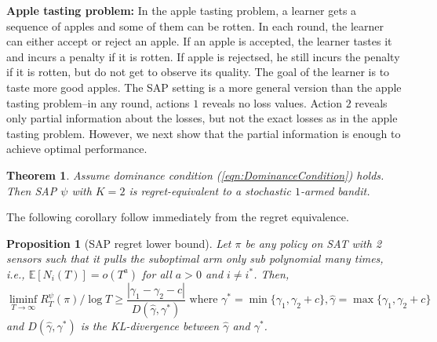 \documentclass{article}
\newtheorem{thm}{Theorem}
\newtheorem{proposition}{Proposition}
\begin{document}
\noindent
{\bf Apple tasting problem:} In the apple tasting problem, a learner gets a sequence of apples and some of them can be rotten. In each round, the learner can either accept or reject an apple. If an apple is accepted, the learner tastes it and incurs a penalty if it is rotten. If apple is rejectsed, he still incurs the penalty if it is rotten, but do not get to observe its quality. %
The goal of the learner is to taste more good apples. 
The SAP setting is a more general version than the apple tasting problem--in any round, actions $1$ reveals no loss values. Action $2$  reveals only partial information about the losses, but not the exact losses as in the apple tasting problem. However, we next show that the partial information is enough to achieve optimal performance.  

\begin{thm}
	\label{thm:2SAPRegret}
Assume dominance condition (\ref{eqn:DominanceCondition}) holds. Then SAP $\psi$ with $K=2$ is regret-equivalent to a stochastic $1$-armed bandit.
\end{thm}
The following corollary follow immediately from the regret equivalence. 
\begin{proposition}[SAP regret lower bound]
	Let $\pi$ be any policy on SAT with 2 sensors such that it pulls the suboptimal arm only sub polynomial many times, i.e., $\mathbb{E}[N_i(T)]=o(T^a)$ for all $a>0$ and $i\neq i^*$. Then,
	\begin{equation}
	\liminf_{T \rightarrow \infty} R^\psi_T(\pi)/\log T \geq \frac{|\gamma_1-\gamma_2-c|}{D(\hat{\gamma},\gamma^*)} \mbox{ where } \gamma^*=\min\{\gamma_1,\gamma_2+c\},  \hat{\gamma}=\max\{\gamma_1,\gamma_2+c\}
	\end{equation}
	and $D(\hat{\gamma},\gamma^*)$  is the KL-divergence between $\hat{\gamma}$ and $\gamma^*$.
\end{proposition}
\end{document}
